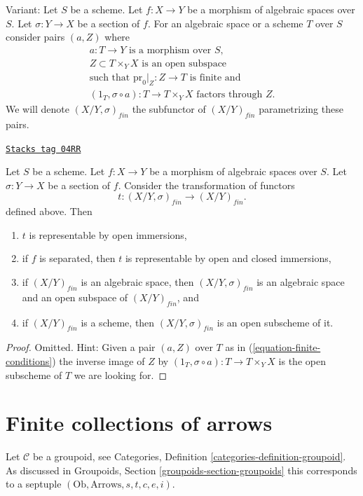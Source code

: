 Variant: Let $S$ be a scheme.
Let $f : X \to Y$ be a morphism of algebraic spaces over $S$.
Let $\sigma : Y \to X$ be a section of $f$.
For an algebraic space or a scheme $T$ over $S$ consider pairs
$(a, Z)$ where
\begin{equation}
\label{equation-finite-conditions-variant}
\begin{matrix}
a : T \to Y\text{ is a morphism over }S, \\
Z \subset T \times_Y X\text{ is an open subspace} \\
\text{such that }\text{pr}_0|_Z : Z \to T\text{ is finite and} \\
(1_T, \sigma \circ a) : T \to T \times_Y X\text{ factors through }Z.
\end{matrix}
\end{equation}
We will denote $(X/Y, \sigma)_{fin}$ the subfunctor of $(X/Y)_{fin}$
parametrizing these pairs.

\begin{lemma}
\label{spaces-more-groupoids-lemma-finite-plus-section}
\href{https://stacks.math.columbia.edu/tag/04RR}{\texttt{Stacks tag 04RR}}

Let $S$ be a scheme.
Let $f : X \to Y$ be a morphism of algebraic spaces over $S$.
Let $\sigma : Y \to X$ be a section of $f$. Consider the
transformation of functors
$$
t : (X/Y, \sigma)_{fin} \longrightarrow (X/Y)_{fin}.
$$
defined above. Then
\begin{enumerate}
\item $t$ is representable by open immersions,
\item if $f$ is separated, then $t$ is representable by open
and closed immersions,
\item if $(X/Y)_{fin}$ is an algebraic space, then
$(X/Y, \sigma)_{fin}$ is an algebraic space and
an open subspace of $(X/Y)_{fin}$, and
\item if $(X/Y)_{fin}$ is a scheme, then $(X/Y, \sigma)_{fin}$ is an
open subscheme of it.
\end{enumerate}
\end{lemma}

\begin{proof}
Omitted. Hint: Given a pair $(a, Z)$ over $T$ as in
(\ref{equation-finite-conditions}) the inverse image of
$Z$ by $(1_T, \sigma \circ a) : T \to T \times_Y X$ is the open
subscheme of $T$ we are looking for.
\end{proof}

\section{Finite collections of arrows}
\label{spaces-more-groupoids-section-finite-set-arrows}
Let $\mathcal{C}$ be a groupoid, see
Categories, Definition \ref{categories-definition-groupoid}.
As discussed in
Groupoids, Section \ref{groupoids-section-groupoids}
this corresponds to a septuple $(\text{Ob}, \text{Arrows}, s, t, c, e, i)$.

